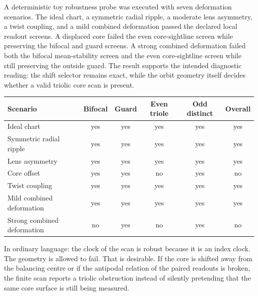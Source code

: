 \begin{remark}
\label{rem:executed-finite-robustness-probe}
A deterministic toy robustness probe was executed with seven deformation scenarios.  The ideal chart, a symmetric radial ripple, a moderate lens asymmetry, a twist coupling, and a mild combined deformation passed the declared local readout screens.  A displaced core failed the even core-sightline screen while preserving the bifocal and guard screens.  A strong combined deformation failed both the bifocal mean-stability screen and the even core-sightline screen while still preserving the outside guard.  The result supports the intended diagnostic reading: the shift selector remains exact, while the orbit geometry itself decides whether a valid triolic core scan is present.
\end{remark}

\begin{center}
\scriptsize
\setlength{\tabcolsep}{3pt}
\begin{tabular}{@{}P{0.28\textwidth}ccccc@{}}
\toprule
Scenario & Bifocal & Guard & Even triole & Odd distinct & Overall\\
\midrule
Ideal chart & yes & yes & yes & yes & yes\\
Symmetric radial ripple & yes & yes & yes & yes & yes\\
Lens asymmetry & yes & yes & yes & yes & yes\\
Core offset & yes & yes & no & yes & no\\
Twist coupling & yes & yes & yes & yes & yes\\
Mild combined deformation & yes & yes & yes & yes & yes\\
Strong combined deformation & no & yes & no & yes & no\\
\bottomrule
\end{tabular}
\end{center}

\begin{remark}
\label{rem:finite-perturbation-human-reading}
In ordinary language: the clock of the scan is robust because it is an index clock.  The geometry is allowed to fail.  That is desirable.  If the core is shifted away from the balancing centre or if the antipodal relation of the paired readouts is broken, the finite scan reports a triolic obstruction instead of silently pretending that the same core surface is still being measured.
\end{remark}


\clearpage


